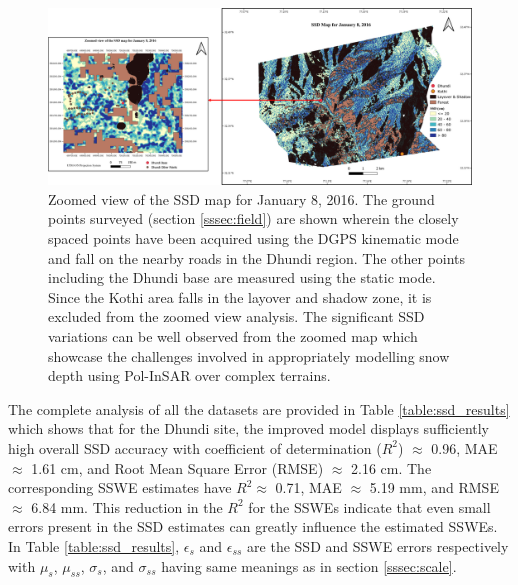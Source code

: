 \documentclass[12pt]{elsarticle}
\numberwithin{equation}{section}
\numberwithin{figure}{section}
\numberwithin{table}{section}
\begin{document}
\afterpage{\FloatBarrier}
\begin{figure}[htb]
    \centering
    \includegraphics[width=\textwidth]{Figures/Results/SSD_Map.png}
    \caption{\doublespacing Zoomed view of the SSD map for January 8, 2016. The ground points surveyed (section \ref{sssec:field}) are shown wherein the closely spaced points have been acquired using the DGPS kinematic mode and fall on the nearby roads in the Dhundi region. The other points including the Dhundi base are measured using the static mode. Since the Kothi area falls in the layover and shadow zone, it is excluded from the zoomed view analysis. The significant SSD variations can be well observed from the zoomed map which showcase the challenges involved in appropriately modelling snow depth using Pol-InSAR over complex terrains.}
    \label{fig:ssd_map}
\end{figure}

The complete analysis of all the datasets are provided in Table \ref{table:ssd_results} which shows that for the Dhundi site, the improved model displays sufficiently high overall SSD accuracy with coefficient of determination ($R^2$) $\approx$ 0.96, MAE $\approx$ 1.61 cm, and Root Mean Square Error (RMSE) $\approx$ 2.16 cm. The corresponding SSWE estimates have $R^2 \approx$ 0.71, MAE $\approx$ 5.19 mm, and RMSE $\approx$ 6.84 mm. This reduction in the $R^2$ for the SSWEs indicate that even small errors present in the SSD estimates can greatly influence the estimated SSWEs. In Table \ref{table:ssd_results}, $\epsilon_s$ and $\epsilon_{ss}$ are the SSD and SSWE errors respectively with $\mu_s$, $\mu_{ss}$, $\sigma_s$, and $\sigma_{ss}$ having same meanings as in section \ref{sssec:scale}.
\end{document}

